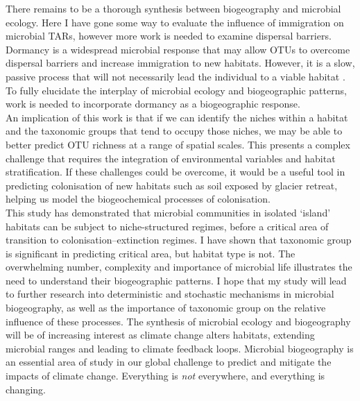\noindent There remains to be a thorough synthesis between biogeography and microbial ecology. Here I have gone some way to evaluate the influence of immigration on microbial TARs, however more work is needed to examine dispersal barriers. Dormancy is a widespread microbial response that may allow OTUs to overcome dispersal barriers and increase immigration to new habitats. However, it is a slow, passive process that will not necessarily lead the individual to a viable habitat \cite{LoceyKennethJ2010Stbw}. To fully elucidate the interplay of microbial ecology and biogeographic patterns, work is needed to incorporate dormancy as a biogeographic response.  \\         

\noindent An implication of this work is that if we can identify the niches within a habitat and the taxonomic groups that tend to occupy those niches, we may be able to better predict OTU richness at a range of spatial scales. This presents a complex challenge that requires the integration of environmental variables and habitat stratification. If these challenges could be overcome, it would be a useful tool in predicting colonisation of new habitats such as soil exposed by glacier retreat, helping us model the biogeochemical processes of colonisation. \\      

\noindent This study has demonstrated that microbial communities in isolated `island' habitats can be subject to niche-structured regimes, before a critical area of transition to colonisation--extinction regimes. I have shown that taxonomic group is significant in predicting critical area, but habitat type is not. The overwhelming number, complexity and importance of microbial life illustrates the need to understand their biogeographic patterns. I hope that my study will lead to further research into deterministic and stochastic mechanisms in microbial biogeography, as well as the importance of taxonomic group on the relative influence of these processes. The synthesis of microbial ecology and biogeography will be of increasing interest as climate change alters habitats, extending microbial ranges and leading to climate feedback loops. Microbial biogeography is an essential area of study in our global challenge to predict and mitigate the impacts of climate change. Everything is \textit{not} everywhere, and everything is changing.             